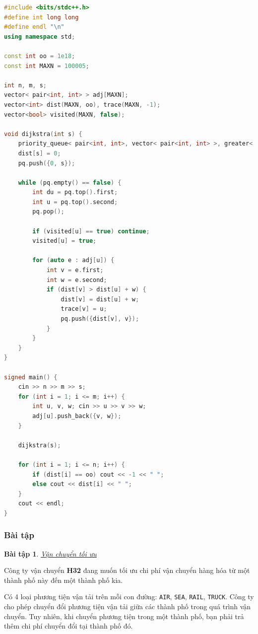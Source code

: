 \documentclass{article}
\newtheorem{baitap}{Bài tập}
\begin{document}
\begin{lstlisting}[language=C++,caption={Cài đặt}]
#include <bits/stdc++.h>
#define int long long
#define endl "\n"
using namespace std;

const int oo = 1e18;
const int MAXN = 100005;

int n, m, s;
vector< pair<int, int> > adj[MAXN];
vector<int> dist(MAXN, oo), trace(MAXN, -1);
vector<bool> visited(MAXN, false);

void dijkstra(int s) {
    priority_queue< pair<int, int>, vector< pair<int, int> >, greater< pair<int, int> > > pq;
    dist[s] = 0;
    pq.push({0, s});

    while (pq.empty() == false) {
        int du = pq.top().first;
        int u = pq.top().second;
        pq.pop();

        if (visited[u] == true) continue;
        visited[u] = true;

        for (auto e : adj[u]) {
            int v = e.first;
            int w = e.second;
            if (dist[v] > dist[u] + w) {
                dist[v] = dist[u] + w;
                trace[v] = u;
                pq.push({dist[v], v});
            }
        }
    }
}

signed main() {
    cin >> n >> m >> s;
    for (int i = 1; i <= m; i++) {
        int u, v, w; cin >> u >> v >> w;
        adj[u].push_back({v, w});
    }

    dijkstra(s);

    for (int i = 1; i <= n; i++) {
        if (dist[i] == oo) cout << -1 << " ";
        else cout << dist[i] << " ";
    }
    cout << endl;
}
\end{lstlisting}

\subsubsection{Bài tập}

\begin{baitap}
    \href{https://oj.iuhcoder.com/problem/traihe25t3_day2_4}{Vận chuyển tối ưu}
\end{baitap}

Công ty vận chuyển \textbf{H32} đang muốn tối ưu chi phí vận chuyển hàng hóa từ một thành phố này đến một thành phố kia.

Có 4 loại phương tiện vận tải trên mỗi con đường: \texttt{AIR}, \texttt{SEA}, \texttt{RAIL}, \texttt{TRUCK}. Công ty cho phép chuyển đổi phương tiện vận tải giữa các thành phố trong quá trình vận chuyển. Tuy nhiên, khi chuyển phương tiện trong một thành phố, bạn phải trả thêm chi phí chuyển đổi tại thành phố đó.
\end{document}
